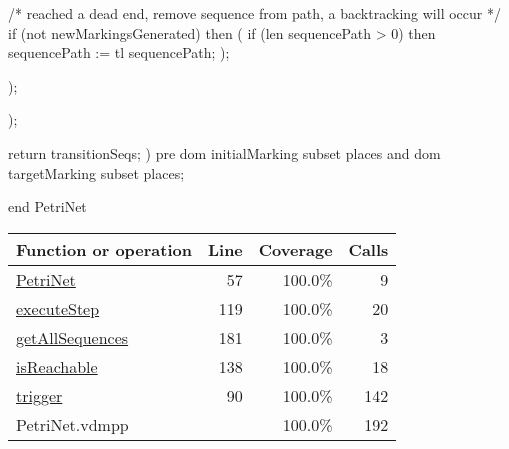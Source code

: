 \begin{vdmpp}
          /* reached a dead end, remove sequence from path, a backtracking will occur */
          if (not newMarkingsGenerated) then (
            if (len sequencePath > 0) then
              sequencePath := tl sequencePath;
          );

        );

      );

      return transitionSeqs;
    )
    pre dom initialMarking subset places and dom targetMarking subset places;

end PetriNet
\end{vdmpp}
\bigskip
\begin{longtable}{|l|r|r|r|}
\hline
Function or operation & Line & Coverage & Calls \\
\hline
\hline
\hyperref[PetriNet:57]{PetriNet} & 57&100.0\% & 9 \\
\hline
\hyperref[executeStep:119]{executeStep} & 119&100.0\% & 20 \\
\hline
\hyperref[getAllSequences:181]{getAllSequences} & 181&100.0\% & 3 \\
\hline
\hyperref[isReachable:138]{isReachable} & 138&100.0\% & 18 \\
\hline
\hyperref[trigger:90]{trigger} & 90&100.0\% & 142 \\
\hline
\hline
PetriNet.vdmpp & & 100.0\% & 192 \\
\hline
\end{longtable}